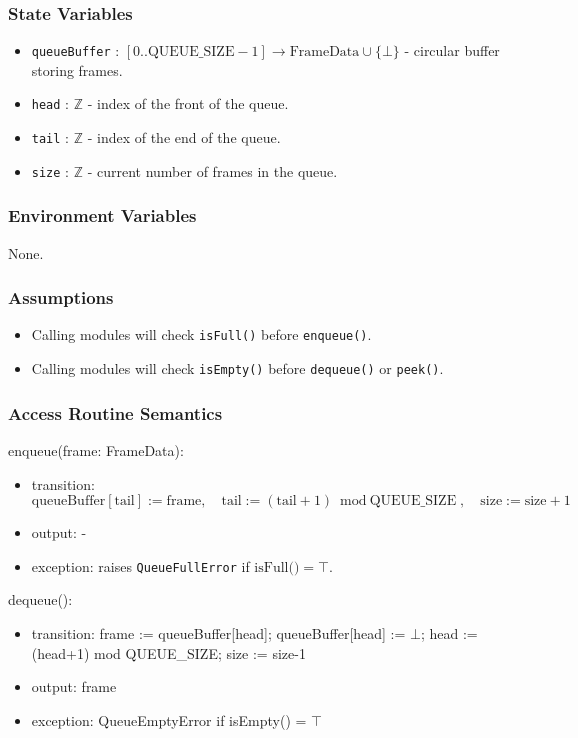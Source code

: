 \documentclass[12pt, titlepage]{article}
\begin{document}
\subsubsection{State Variables}
\begin{itemize}
\item \texttt{queueBuffer} : $[0..\text{QUEUE\_SIZE}-1] \rightarrow \text{FrameData} \cup \{\bot\}$ - circular buffer storing frames.
\item \texttt{head} : $\mathbb{Z}$ - index of the front of the queue.
\item \texttt{tail} : $\mathbb{Z}$ - index of the end of the queue.
\item \texttt{size} : $\mathbb{Z}$ - current number of frames in the queue.
\end{itemize}

\subsubsection{Environment Variables}
None.

\subsubsection{Assumptions}
\begin{itemize}
    \item Calling modules will check \texttt{isFull()} before \texttt{enqueue()}.
    \item Calling modules will check \texttt{isEmpty()} before \texttt{dequeue()} or \texttt{peek()}.
\end{itemize}

\subsubsection{Access Routine Semantics}

\noindent enqueue(frame: FrameData):
\begin{itemize}
\item transition:  
\[
\text{queueBuffer}[\text{tail}] := \text{frame}, \quad
\text{tail} := (\text{tail} + 1) \bmod \text{QUEUE\_SIZE}, \quad
\text{size} := \text{size} + 1
\]
\item output: -
\item exception: raises \texttt{QueueFullError} if $\text{isFull()} = \top$.
\end{itemize}

\noindent dequeue():
\begin{itemize}
\item transition: frame := queueBuffer[head]; queueBuffer[head] := $\bot$; head := (head+1) mod QUEUE\_SIZE; size := size-1
\item output: frame
\item exception: QueueEmptyError if isEmpty() = $\top$
\end{itemize}
\end{document}
